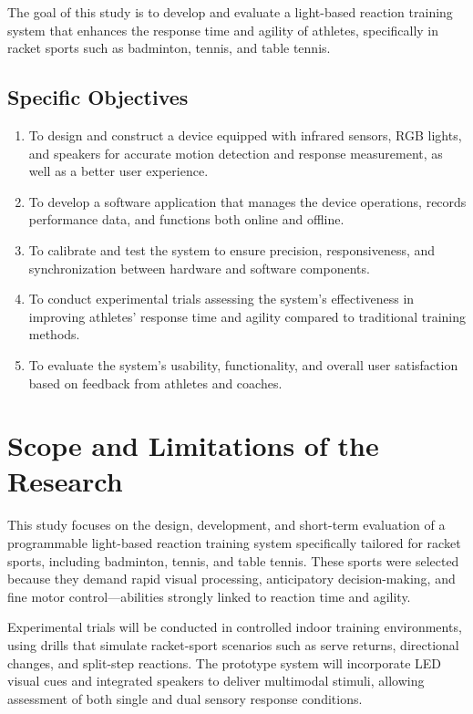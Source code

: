 The goal of this study is to develop and evaluate a light-based reaction training system that enhances the response time and agility of athletes, specifically in racket sports such as badminton, tennis, and table tennis.

\subsection{Specific Objectives}
\label{sec:specificobjectives}

\begin{enumerate}
   \item To design and construct a device equipped with infrared sensors, RGB lights, and speakers for accurate motion detection and response measurement, as well as a better user experience.
   
   \item To develop a software application that manages the device operations, records performance data, and functions both online and offline.
   
   \item To calibrate and test the system to ensure precision, responsiveness, and synchronization between hardware and software components.
   
   \item To conduct experimental trials assessing the system’s effectiveness in improving athletes’ response time and agility compared to traditional training methods.
   
   \item To evaluate the system’s usability, functionality, and overall user satisfaction based on feedback from athletes and coaches.
\end{enumerate}


\section{Scope and Limitations of the Research}
\label{sec:scopelimitations}

This study focuses on the design, development, and short-term evaluation of a programmable light-based reaction training system specifically tailored for racket sports, including badminton, tennis, and table tennis. These sports were selected because they demand rapid visual processing, anticipatory decision-making, and fine motor control—abilities strongly linked to reaction time and agility.

Experimental trials will be conducted in controlled indoor training environments, using drills that simulate racket-sport scenarios such as serve returns, directional changes, and split-step reactions. The prototype system will incorporate LED visual cues and integrated speakers to deliver multimodal stimuli, allowing assessment of both single and dual sensory response conditions.

